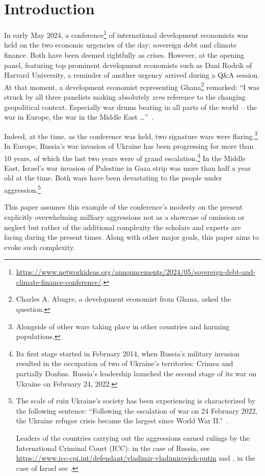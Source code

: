 \section{Introduction}

In early May 2024, a conference\footnote{\url{https://www.networkideas.org/announcements/2024/05/sovereign-debt-and-climate-finance-conference/}.} of international development economists was held on the two economic urgencies of the day: sovereign debt and climate finance. Both have been deemed rightfully as crises. However, at the opening panel, featuring top prominent development economists such as Dani Rodrik of Harvard University, a reminder of another urgency arrived during a Q\&A session. At that moment, a development economist representing Ghana\footnote{Charles A. Abugre, a development economist from Ghana, asked the question.} remarked: ``I was struck by all three panelists making absolutely \textit{zero} reference to the changing geopolitical context. Especially war drums beating in all parts of the world -- the war in Europe, the war in the Middle East \dots''~\citep[watch since 12:40 minute, emphasis added]{idea2024}. 

Indeed, at the time, as the conference was held, two signature wars were flaring.\footnote{Alongside of other wars taking place in other countries and harming populations.} In Europe, Russia's war invasion of Ukraine has been progressing for more than 10 years, of which the last two years were of grand escalation.\footnote{Its first stage started in February 2014, when Russia's military invasion resulted in the occupation of two of Ukraine's territories: Crimea and partially Donbas. Russia's leadership launched the second stage of its war on Ukraine on February 24, 2022.} In the Middle East, Israel's war invasion of Palestine in Gaza strip was more than half a year old at the time. Both wars have been devastating to the people under aggression.\footnote{The scale of ruin Ukraine's society has been experiencing is characterized by the following sentence: ``Following the escalation of war on 24 February 2022, the Ukraine refugee crisis became the largest since World War II.''~\citep[p.~2]{unisef2022}.\par Leaders of the countries carrying out the aggressions earned rulings by the International Criminal Court (ICC): in the case of Russia, see \url{https://www.icc-cpi.int/defendant/vladimir-vladimirovich-putin} and \cite{icc2023}, in the case of Israel see \cite{icc2024}.}

This paper assumes this example of the conference's modesty on the present explicitly overwhelming milliary aggressions not as a showcase of omission or neglect but rather of the additional complexity the scholars and experts are facing during the present times. Along with other major goals, this paper aims to evoke such complexity.


